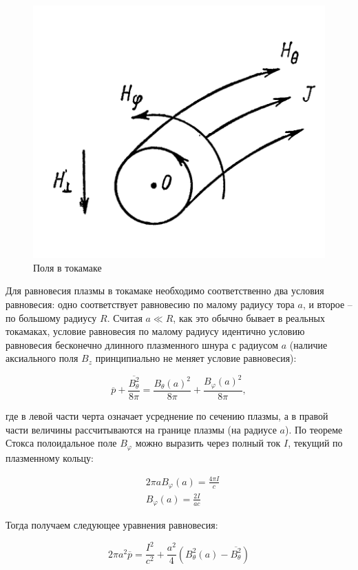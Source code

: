 \documentclass[10pt, a4paper]{article}
\begin{document}
\begin{figure}[ht]
	\begin{center}
		\includegraphics[width=0.5\linewidth]{6.tokamak_fields.png}
	\end{center}
    \caption{Поля в токамаке~\cite{arzimovich}}
    \label{fig:tokamak_fields} 
\end{figure}

Для равновесия плазмы в токамаке необходимо соответственно два условия равновесия: одно соответствует равновесию по малому радиусу тора $a$, и второе -- по большому радиусу $R$. Считая $a\ll R$, как это обычно бывает в реальных токамаках, условие равновесия по малому радиусу идентично условию равновесия бесконечно длинного плазменного шнура с радиусом $a$ (наличие аксиального поля $B_z$ принципиально не меняет условие равновесия):

\begin{equation*}
   \overline{p} + \frac{\overline{B_\theta^2}}{8\pi} = \frac{B_\theta(a)^2}{8\pi} + \frac{B_\varphi(a)^2}{8\pi},
\end{equation*}

где в левой части черта означает усреднение по сечению плазмы, а в правой части величины рассчитываются на границе плазмы (на радиусе $a$). По теореме Стокса полоидальное поле $B_\varphi$ можно выразить через полный ток $I$, текущий по плазменному кольцу:

\begin{align*}
   &2\pi a B_\varphi(a) = \frac{4\pi I}{c} \\
   &B_\varphi(a) = \frac{2I}{ac}
\end{align*}

Тогда получаем следующее уравнения равновесия:

\begin{equation*}
   2\pi a^2\overline{p} = \frac{I^2}{c^2} + \frac{a^2}{4}\left( B_\theta^2(a) - \overline	{B_\theta^2} \right)
\end{equation*}
\end{document}
